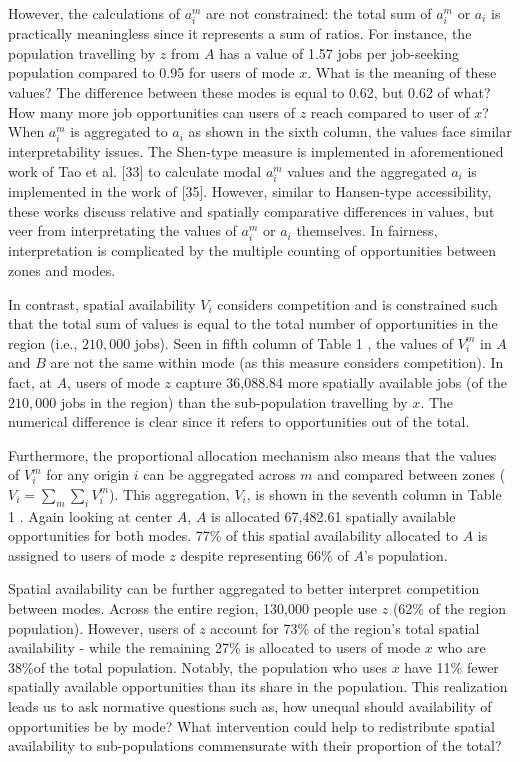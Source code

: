\documentclass[10pt,letterpaper]{article}
\begin{document}
However, the calculations of \(a_i^m\) are not constrained: the total
sum of \(a_i^m\) or \(a_i\) is practically meaningless since it
represents a sum of ratios. For instance, the population travelling by
\(z\) from \(A\) has a value of 1.57 jobs per job-seeking population
compared to 0.95 for users of mode \(x\). What is the meaning of these
values? The difference between these modes is equal to 0.62, but 0.62 of
what? How many more job opportunities can users of \(z\) reach compared
to user of \(x\)? When \(a_i^m\) is aggregated to \(a_i\) as shown in
the sixth column, the values face similar interpretability issues. The
Shen-type measure is implemented in aforementioned work of Tao et al.
{[}33{]} to calculate modal \(a_i^m\) values and the aggregated \(a_i\)
is implemented in the work of {[}35{]}. However, similar to Hansen-type
accessibility, these works discuss relative and spatially comparative
differences in values, but veer from interpretating the values of
\(a_i^m\) or \(a_i\) themselves. In fairness, interpretation is
complicated by the multiple counting of opportunities between zones and
modes.

In contrast, spatial availability \(V_i\) considers competition and is
constrained such that the total sum of values is equal to the total
number of opportunities in the region (i.e., \(210,000\) jobs). Seen in
fifth column of Table 1 , the values of \(V_i^m\) in \(A\) and \(B\) are
not the same within mode (as this measure considers competition). In
fact, at \(A\), users of mode \(z\) capture 36,088.84 more spatially
available jobs (of the \(210,000\) jobs in the region) than the
sub-population travelling by \(x\). The numerical difference is clear
since it refers to opportunities out of the total.

Furthermore, the proportional allocation mechanism also means that the
values of \(V_i^m\) for any origin \(i\) can be aggregated across \(m\)
and compared between zones (\(V_i = \sum_m{\sum_i{V_i^m}}\)). This
aggregation, \(V_i\), is shown in the seventh column in Table 1 . Again
looking at center \(A\), \(A\) is allocated 67,482.61 spatially
available opportunities for both modes. 77\% of this spatial
availability allocated to \(A\) is assigned to users of mode \(z\)
despite representing 66\% of \(A\)'s population.

Spatial availability can be further aggregated to better interpret
competition between modes. Across the entire region, 130,000 people use
\(z\) (62\% of the region population). However, users of \(z\) account
for 73\% of the region's total spatial availability - while the
remaining 27\% is allocated to users of mode \(x\) who are 38\%of the
total population. Notably, the population who uses \(x\) have 11\% fewer
spatially available opportunities than its share in the population. This
realization leads us to ask normative questions such as, how unequal
should availability of opportunities be by mode? What intervention could
help to redistribute spatial availability to sub-populations
commensurate with their proportion of the total?
\end{document}

